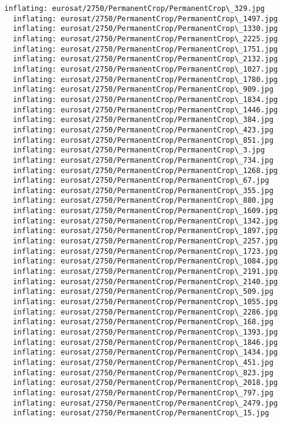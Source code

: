 \documentclass[11pt]{article}
\begin{document}
\begin{Verbatim}[commandchars=\\\{\}]
  inflating: eurosat/2750/PermanentCrop/PermanentCrop\_329.jpg
  inflating: eurosat/2750/PermanentCrop/PermanentCrop\_1497.jpg
  inflating: eurosat/2750/PermanentCrop/PermanentCrop\_1330.jpg
  inflating: eurosat/2750/PermanentCrop/PermanentCrop\_2225.jpg
  inflating: eurosat/2750/PermanentCrop/PermanentCrop\_1751.jpg
  inflating: eurosat/2750/PermanentCrop/PermanentCrop\_2132.jpg
  inflating: eurosat/2750/PermanentCrop/PermanentCrop\_1027.jpg
  inflating: eurosat/2750/PermanentCrop/PermanentCrop\_1780.jpg
  inflating: eurosat/2750/PermanentCrop/PermanentCrop\_909.jpg
  inflating: eurosat/2750/PermanentCrop/PermanentCrop\_1834.jpg
  inflating: eurosat/2750/PermanentCrop/PermanentCrop\_1446.jpg
  inflating: eurosat/2750/PermanentCrop/PermanentCrop\_384.jpg
  inflating: eurosat/2750/PermanentCrop/PermanentCrop\_423.jpg
  inflating: eurosat/2750/PermanentCrop/PermanentCrop\_851.jpg
  inflating: eurosat/2750/PermanentCrop/PermanentCrop\_3.jpg
  inflating: eurosat/2750/PermanentCrop/PermanentCrop\_734.jpg
  inflating: eurosat/2750/PermanentCrop/PermanentCrop\_1268.jpg
  inflating: eurosat/2750/PermanentCrop/PermanentCrop\_67.jpg
  inflating: eurosat/2750/PermanentCrop/PermanentCrop\_355.jpg
  inflating: eurosat/2750/PermanentCrop/PermanentCrop\_880.jpg
  inflating: eurosat/2750/PermanentCrop/PermanentCrop\_1609.jpg
  inflating: eurosat/2750/PermanentCrop/PermanentCrop\_1342.jpg
  inflating: eurosat/2750/PermanentCrop/PermanentCrop\_1897.jpg
  inflating: eurosat/2750/PermanentCrop/PermanentCrop\_2257.jpg
  inflating: eurosat/2750/PermanentCrop/PermanentCrop\_1723.jpg
  inflating: eurosat/2750/PermanentCrop/PermanentCrop\_1084.jpg
  inflating: eurosat/2750/PermanentCrop/PermanentCrop\_2191.jpg
  inflating: eurosat/2750/PermanentCrop/PermanentCrop\_2140.jpg
  inflating: eurosat/2750/PermanentCrop/PermanentCrop\_509.jpg
  inflating: eurosat/2750/PermanentCrop/PermanentCrop\_1055.jpg
  inflating: eurosat/2750/PermanentCrop/PermanentCrop\_2286.jpg
  inflating: eurosat/2750/PermanentCrop/PermanentCrop\_168.jpg
  inflating: eurosat/2750/PermanentCrop/PermanentCrop\_1393.jpg
  inflating: eurosat/2750/PermanentCrop/PermanentCrop\_1846.jpg
  inflating: eurosat/2750/PermanentCrop/PermanentCrop\_1434.jpg
  inflating: eurosat/2750/PermanentCrop/PermanentCrop\_451.jpg
  inflating: eurosat/2750/PermanentCrop/PermanentCrop\_823.jpg
  inflating: eurosat/2750/PermanentCrop/PermanentCrop\_2018.jpg
  inflating: eurosat/2750/PermanentCrop/PermanentCrop\_797.jpg
  inflating: eurosat/2750/PermanentCrop/PermanentCrop\_2479.jpg
  inflating: eurosat/2750/PermanentCrop/PermanentCrop\_15.jpg

\end{Verbatim}
\end{document}
